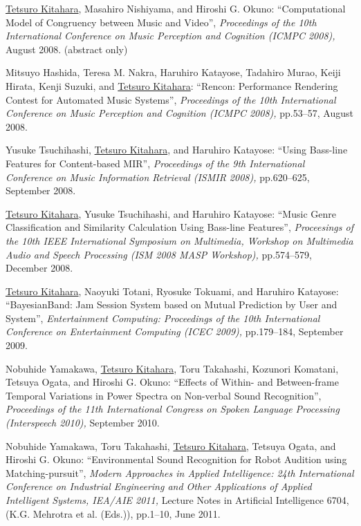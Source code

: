 \begin{Enumerate}
\item 
\underline{Tetsuro Kitahara}, 
Masahiro Nishiyama, 
and 
Hiroshi
      G. Okuno: 
    ``Computational Model of Congruency between Music and Video'', 
    {\it Proceedings of the 10th International Conference on
      Music Perception and Cognition
          (ICMPC 2008),
        } August 2008. 
(abstract only)
\item 
Mitsuyo Hashida, 
Teresa M. Nakra, 
Haruhiro Katayose, 
Tadahiro Murao, 
Keiji Hirata, 
Kenji Suzuki, 
and 
\underline{Tetsuro Kitahara}: 
    ``Rencon: Performance Rendering Contest for Automated Music Systems'', 
    {\it Proceedings of the 10th International Conference on
      Music Perception and Cognition
          (ICMPC 2008),
        } pp.53--57, August 2008. 

\item 
Yusuke Tsuchihashi, 
\underline{Tetsuro Kitahara}, 
and 
Haruhiro Katayose: 
    ``Using Bass-line Features for Content-based MIR'', 
    {\it Proceedings of
      the 9th International Conference on Music Information Retrieval 
          (ISMIR 2008),
        } pp.620--625, September 2008. 

\item 
\underline{Tetsuro Kitahara}, 
Yusuke Tsuchihashi, 
and 
Haruhiro Katayose: 
    ``Music Genre Classification and Similarity Calculation Using Bass-line Features'', 
    {\it Proceesings of the 10th IEEE
      International Symposium on Multimedia, Workshop on Multimedia Audio and Speech Processing
          (ISM 2008 MASP Workshop),
        } pp.574--579, December 2008. 

\item 
\underline{Tetsuro Kitahara}, 
Naoyuki Totani, 
Ryosuke Tokuami, 
and 
Haruhiro Katayose: 
    ``BayesianBand: Jam Session System based on Mutual Prediction by User and System'', 
    {\it Entertainment Computing: Proceedings of the 10th International Conference on
    Entertainment Computing (ICEC 2009),
    } pp.179--184, September 2009. 

\item 
Nobuhide Yamakawa, 
\underline{Tetsuro Kitahara}, 
Toru Takahashi, 
Kozunori Komatani, 
Tetsuya Ogata, 
and 
Hiroshi G. Okuno: 
    ``Effects of Within- and Between-frame Temporal Variations in Power Spectra on Non-verbal Sound Recognition'', 
    {\it Proceedings of the 11th International Congress on Spoken Language Processing (Interspeech 2010),
    } September 2010. 

\item 
Nobuhide Yamakawa, 
Toru Takahashi, 
\underline{Tetsuro Kitahara}, 
Tetsuya Ogata, 
and 
Hiroshi G. Okuno: 
    ``Environmental Sound Recognition for Robot Audition using Matching-pursuit'', 
    {\it Modern Approaches in Applied Intelligence: 24th International Conference on Industrial Engineering and Other Applications of Applied Intelligent Systems, IEA/AIE 2011,
    } Lecture Notes in Artificial Intelligence 6704, (K.G. Mehrotra et al. (Eds.)), pp.1--10, June 2011. 


\end{Enumerate}
